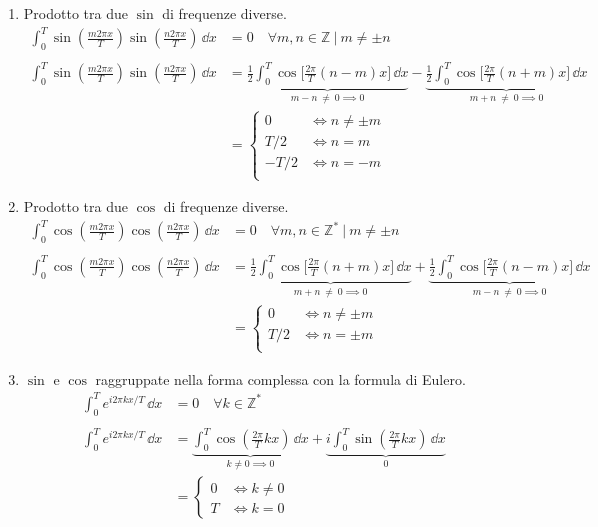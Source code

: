 \begin{enumerate}
\item {
    Prodotto tra due \(\sin\) di frequenze diverse.
    \begin{align*}
        \int_0^T \sin(\frac{m2\pi x}{T})\sin(\frac{n2\pi x}{T})\,\dd{x} &= 0 
        \quad \forall m,n \in \mathbb{Z}~|~m\neq \pm n \\
        \\
        \int_0^T \sin(\frac{m2\pi x}{T})\sin(\frac{n2\pi x}{T})\,\dd{x} &= 
        \underbrace{\frac{1}{2}\int_0^T\cos\bigg[\frac{2\pi}{T}(n-m)x\bigg]\,\dd{x}}_{m-n~\neq~0\implies 0} -
        \underbrace{\frac{1}{2}\int_0^T\cos\bigg[\frac{2\pi}{T}(n+m)x\bigg]\,\dd{x}}_{m+n~\neq~0\implies 0} \\
        &= \begin{cases}
            0 & \iff n \neq \pm m \\
            T/2 & \iff n = m \\
            - T/2 & \iff n = - m \\
        \end{cases}
    \end{align*}
}

\item {
    Prodotto tra due \(\cos\) di frequenze diverse.
    \begin{align*}
        \int_0^T \cos(\frac{m2\pi x}{T})\cos(\frac{n2\pi x}{T})\,\dd{x} &= 0 
        \quad \forall m,n \in \mathbb{Z}^*~|~m\neq \pm n \\
        \\
        \int_0^T \cos(\frac{m2\pi x}{T})\cos(\frac{n2\pi x}{T})\,\dd{x} &= 
        \underbrace{\frac{1}{2}\int_0^T\cos\bigg[\frac{2\pi}{T}(n+m)x\bigg]\,\dd{x}}_{m+n~\neq~0\implies 0} +
        \underbrace{\frac{1}{2}\int_0^T\cos\bigg[\frac{2\pi}{T}(n-m)x\bigg]\,\dd{x}}_{m-n~\neq~0\implies 0} \\
        &= \begin{cases}
            0 & \iff n \neq \pm m \\
            T/2 & \iff n = \pm m \\
        \end{cases}
    \end{align*}
}

\item {
    \(\sin\) e \(\cos\) raggruppate nella forma complessa con la formula di Eulero.
    \begin{align*}
        \int_0^T e^{i2\pi kx/T}\,\dd{x} &= 0
        \quad \forall k \in \mathbb{Z}^* \\
        \\
        \int_0^T e^{i2\pi kx/T}\,\dd{x} &=
        \underbrace{\int_0^T\cos(\frac{2\pi}{T} kx)\,\dd{x}}_{k\neq 0 \implies 0} + 
        \underbrace{i\int_0^T\sin(\frac{2\pi}{T} kx)\,\dd{x}}_{0}  \\
        &= \begin{cases}
            0 & \iff k \neq 0 \\
            T & \iff k = 0
        \end{cases}
    \end{align*}
}
\end{enumerate}

